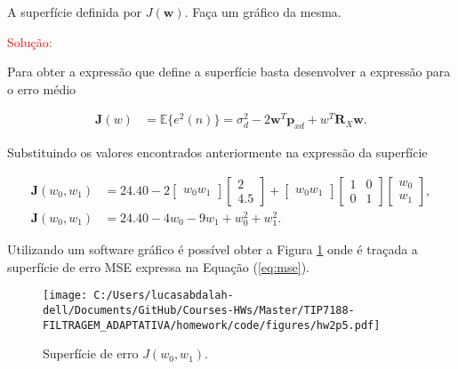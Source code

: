 A superfície definida por $J(\mathbf{w})$. Faça um gráfico da mesma.

\textcolor{red}{Solução:}

Para obter a expressão que define a superfície basta desenvolver a expressão para o erro médio

\begin{align}
    \mathbf{J}(w) &= \mathbb{E}\{e^{2}(n)\} = \sigma^{2}_{d} - 2\mathbf{w}^{T}\mathbf{p}_{xd} + w^{T}\mathbf{R}_{X}\mathbf{w}. \label{eq:mse}   
\end{align}

Substituindo os valores encontrados anteriormente na expressão da superfície

\begin{align}
    \mathbf{J}(w_{0}, w_{1}) &= 24.40 - 2 \left[ \begin{matrix} w_{0}  w_{1} \end{matrix} \right] \left[ \begin{matrix} 2 \\ 4.5 \end{matrix} \right] + \left[ \begin{matrix} w_{0}  w_{1} \end{matrix} \right] \left[ \begin{matrix} 1 & 0 \\ 0 & 1 \end{matrix} \right]  \left[ \begin{matrix} w_{0}  \\ w_{1} \end{matrix} \right], \\
    \mathbf{J}(w_{0},w_{1}) &= 24.40 - 4w_{0} - 9w_{1} + w^{2}_{0} + w^{2}_{1}.
\end{align}

Utilizando um software gráfico é possível obter a Figura \ref{fig:hw2p5} onde é traçada a superfície de erro MSE expressa na Equação (\ref{eq:mse}).

\begin{figure}[!htb]
    \centering
    \texttt{[image: C:/Users/lucasabdalah-dell/Documents/GitHub/Courses-HWs/Master/TIP7188-FILTRAGEM\_ADAPTATIVA/homework/code/figures/hw2p5.pdf]}
    \caption{Superfície de erro $J(w_{0}, w_{1})$.}
    \label{fig:hw2p5}
\end{figure}

